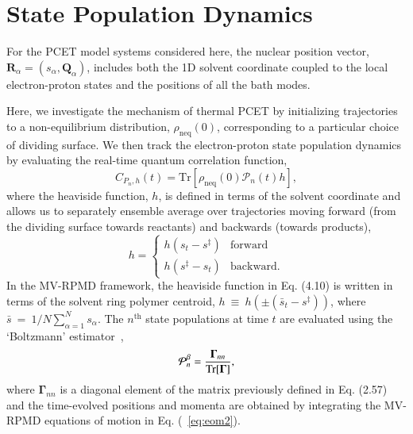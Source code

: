 \documentclass[phd,tocprelim]{cornell}
\begin{document}
\section{State Population Dynamics}
For the PCET model systems considered here,
the nuclear position vector, 
$\mathbf{R}_\alpha=(s_\alpha,\mathbf{Q}_\alpha)$,
includes both the 1D solvent coordinate coupled 
to the local electron-proton states and the 
positions of all the bath modes.

Here, we investigate the mechanism of thermal PCET
by initializing trajectories to a non-equilibrium 
distribution, $\rho_\textrm{neq}(0)$, corresponding 
to a particular choice of dividing surface.
We then track the electron-proton state population dynamics 
by evaluating the real-time quantum correlation function,
\begin{equation}
\label{eq:popcorr} 
C_{P_n,h}(t)= \textrm{Tr}\left[
\rho_\textrm{neq}(0)\mathcal{P}_{n}(t)h\right],
\end{equation} 
where the heaviside function, $h$, is defined in terms of 
the solvent coordinate and allows us to separately 
ensemble average over 
trajectories moving forward (from the dividing surface 
    towards reactants) and backwards (towards products),
\begin{equation}
    h=\left\{
     \begin{array}{ll}
      h(s_t - s^\ddagger) & \textrm{forward}\\
      h(s^\ddagger-s_t) & \textrm{backward.}
    \end{array}\right.
    \label{eq:hs}
\end{equation}
In the MV-RPMD framework, the heaviside function in 
Eq. (4.10)%
is written in terms of the solvent ring polymer 
centroid, $h~\equiv~h(\pm(\bar s_t-s^\ddagger))$, 
where $\bar s~=~1/N\sum_{\alpha=1}^N s_\alpha$.
The $n^\textrm{th}$ state populations at time $t$ are 
evaluated using the `Boltzmann' estimator~\cite{NA2013,NA2015},
\begin{equation}
\label{eq:boltzpop} 
\mathcal{P}_n^{\beta} =
\frac{{\bf{\Gamma}}_{nn}}{\textrm{Tr}[{\bf{\Gamma}}]},
\end{equation}
where $\mathbf{\Gamma}_{nn}$ is a 
diagonal element of the  matrix previously defined in 
Eq. (2.57) and the time-evolved positions
and momenta are obtained by integrating 
the MV-RPMD equations of motion in Eq. (~\ref{eq:eom2}).
\end{document}
